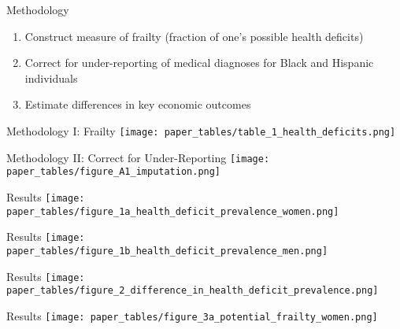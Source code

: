 \documentclass[10pt]{beamer}
\begin{document}
\begin{frame}{Methodology}
    \begin{enumerate}
        \item Construct measure of frailty (fraction of one's possible health deficits) \\
        \item Correct for under-reporting of medical diagnoses for Black and Hispanic individuals \\
        \item Estimate differences in key economic outcomes
    \end{enumerate}
\end{frame}

\begin{frame}{Methodology I: Frailty}
    \hspace*{0.2cm}
    \texttt{[image: paper\_tables/table\_1\_health\_deficits.png]}
\end{frame}

\begin{frame}{Methodology II: Correct for Under-Reporting}
    \hspace*{-0.75cm}
    \texttt{[image: paper\_tables/figure\_A1\_imputation.png]}
\end{frame}

\begin{frame}{Results}
    \hspace*{-0.5cm}
    \texttt{[image: paper\_tables/figure\_1a\_health\_deficit\_prevalence\_women.png]}
\end{frame}

\begin{frame}{Results}
    \hspace*{-0.5cm}
    \texttt{[image: paper\_tables/figure\_1b\_health\_deficit\_prevalence\_men.png]}
\end{frame}

\begin{frame}{Results}
    \hspace*{-0.5cm}
    \texttt{[image: paper\_tables/figure\_2\_difference\_in\_health\_deficit\_prevalence.png]}
\end{frame}

\begin{frame}{Results}
    \hspace*{-0.25cm}
    \texttt{[image: paper\_tables/figure\_3a\_potential\_frailty\_women.png]}
\end{frame}
\end{document}
